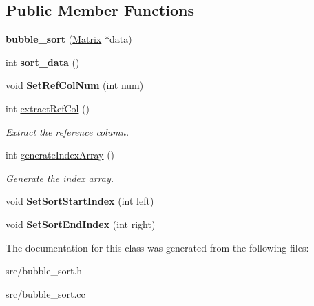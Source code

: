 \subsection*{Public Member Functions}
\begin{DoxyCompactItemize}
\item 
\hypertarget{classbubble__sort_aa413fc87fd7b9a0da354c0da0bfc0fa2}{
{\bfseries bubble\_\-sort} (\hyperlink{classMatrix}{Matrix} $\ast$data)}
\label{dc/d2f/classbubble__sort_aa413fc87fd7b9a0da354c0da0bfc0fa2}

\item 
\hypertarget{classbubble__sort_a8fdc845adc8e24bbb169b79ef5140ee2}{
int {\bfseries sort\_\-data} ()}
\label{dc/d2f/classbubble__sort_a8fdc845adc8e24bbb169b79ef5140ee2}

\item 
\hypertarget{classbubble__sort_af950c87cd047c9d26b12cba8e06e6326}{
void {\bfseries SetRefColNum} (int num)}
\label{dc/d2f/classbubble__sort_af950c87cd047c9d26b12cba8e06e6326}

\item 
\hypertarget{classbubble__sort_a5841fb69c48b516887d255872661df43}{
int \hyperlink{classbubble__sort_a5841fb69c48b516887d255872661df43}{extractRefCol} ()}
\label{dc/d2f/classbubble__sort_a5841fb69c48b516887d255872661df43}

\begin{DoxyCompactList}\small\item\em Extract the reference column. \item\end{DoxyCompactList}\item 
\hypertarget{classbubble__sort_a2bc0328556ec6c5b4a3b137384931847}{
int \hyperlink{classbubble__sort_a2bc0328556ec6c5b4a3b137384931847}{generateIndexArray} ()}
\label{dc/d2f/classbubble__sort_a2bc0328556ec6c5b4a3b137384931847}

\begin{DoxyCompactList}\small\item\em Generate the index array. \item\end{DoxyCompactList}\item 
\hypertarget{classbubble__sort_a31f5f4c45206a61ab2ad2a93c87c1d09}{
void {\bfseries SetSortStartIndex} (int left)}
\label{dc/d2f/classbubble__sort_a31f5f4c45206a61ab2ad2a93c87c1d09}

\item 
\hypertarget{classbubble__sort_a0f6e342a69d660ac75a824d8711894e4}{
void {\bfseries SetSortEndIndex} (int right)}
\label{dc/d2f/classbubble__sort_a0f6e342a69d660ac75a824d8711894e4}

\end{DoxyCompactItemize}


The documentation for this class was generated from the following files:\begin{DoxyCompactItemize}
\item 
src/bubble\_\-sort.h\item 
src/bubble\_\-sort.cc\end{DoxyCompactItemize}
